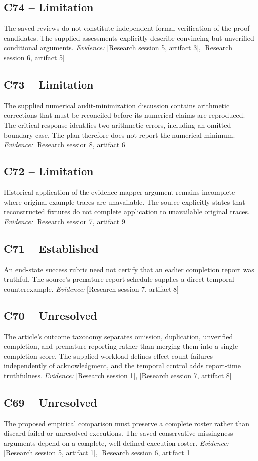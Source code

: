 \documentclass[11pt]{article}
\begin{document}
\begin{sloppypar}
\subsection{C74 -- Limitation}
The saved reviews do not constitute independent formal verification of the proof candidates.
The supplied assessments explicitly describe convincing but unverified conditional arguments.
\textit{Evidence: }[Research session 5, artifact 3], [Research session 6, artifact 5]
\subsection{C73 -- Limitation}
The supplied numerical audit-minimization discussion contains arithmetic corrections that must be reconciled before its numerical claims are reproduced.
The critical response identifies two arithmetic errors, including an omitted boundary case. The plan therefore does not report the numerical minimum.
\textit{Evidence: }[Research session 8, artifact 6]
\subsection{C72 -- Limitation}
Historical application of the evidence-mapper argument remains incomplete where original example traces are unavailable.
The source explicitly states that reconstructed fixtures do not complete application to unavailable original traces.
\textit{Evidence: }[Research session 7, artifact 9]
\subsection{C71 -- Established}
An end-state success rubric need not certify that an earlier completion report was truthful.
The source's premature-report schedule supplies a direct temporal counterexample.
\textit{Evidence: }[Research session 7, artifact 8]
\subsection{C70 -- Unresolved}
The article's outcome taxonomy separates omission, duplication, unverified completion, and premature reporting rather than merging them into a single completion score.
The supplied workload defines effect-count failures independently of acknowledgment, and the temporal control adds report-time truthfulness.
\textit{Evidence: }[Research session 1], [Research session 7, artifact 8]
\subsection{C69 -- Unresolved}
The proposed empirical comparison must preserve a complete roster rather than discard failed or unresolved executions.
The saved conservative missingness arguments depend on a complete, well-defined execution roster.
\textit{Evidence: }[Research session 5, artifact 1], [Research session 6, artifact 1]

\end{sloppypar}
\end{document}
